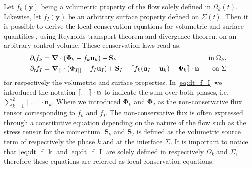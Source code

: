 Let $f_k(\textbf{y})$ being a volumetric property of the flow solely defined in $\Omega_k(t)$.
Likewise, let $f_I(\textbf{y})$ be an arbitrary surface property defined on $\Sigma(t)$.
Then it is possible to derive the local conservation equations for volumetric and surface quantities \citep{bothe2022sharp,morel2015mathematical,tignol1986modelisation}, using Reynolds transport theorem  and divergence theorem on an arbitrary control volume.
These conservation laws read as, 
\begin{align}
    \label{eq:dt_f_k}
    \partial_t f_k
    &= \bm{\nabla} \cdot \left(
        \bm{\Phi}_k
        - f_k\textbf{u}_k
        \right)
    + \textbf{S}_k
    & \text{ in } \Omega_k,&\\
    \partial_t f_I  
    &= 
    \bm{\nabla}_{||} \cdot (\mathbf{\Phi}_{I||} - f_I \textbf{u}_I)
    + \textbf{S}_I
    - \llbracket 
        f_k (\textbf{u}_I - \textbf{u}_k)
        + \mathbf{\Phi}_k
      \rrbracket \cdot \textbf{n} 
    & \text{ on } \Sigma&
    \label{eq:dt_f_I}
\end{align}
for respectively the volumetric and surface properties.
In \ref{eq:dt_f_I} we introduced the notation $\llbracket \ldots \rrbracket \cdot \textbf{n}$ to indicate the sum over both phases, i.e. $\sum_{k=1}^2 [\ldots] \cdot \textbf{n}_k$. 
Where we introduced $\bm{\Phi}_k$ and $\bm{\Phi}_I$ as the non-conservative flux tensor corresponding to $f_k$ and $f_I$. 
The non-conservative flux is often expressed through a constitutive equation depending on the nature of the flow such as the stress tensor for the momentum.
$\textbf{S}_k$ and $\textbf{S}_I$ is defined as the volumetric source term of respectively the phase $k$ and at the interface $\Sigma$.
It is important to notice that \ref{eq:dt_f_k} and \ref{eq:dt_f_I} are solely defined in respectively $\Omega_k$ and $\Sigma$, therefore these equations are referred as local conservation equations.

